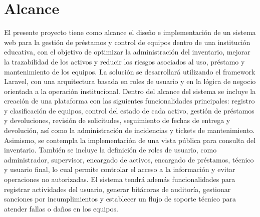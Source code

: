 \section{Alcance}
El presente proyecto tiene como alcance el diseño e implementación de un sistema web para la gestión de préstamos y control de equipos dentro de una institución educativa, con el objetivo de optimizar la administración del inventario, mejorar la trazabilidad de los activos y reducir los riesgos asociados al uso, préstamo y mantenimiento de los equipos. La solución se desarrollará utilizando el framework Laravel, con una arquitectura basada en roles de usuario y en la lógica de negocio orientada a la operación institucional.
Dentro del alcance del sistema se incluye la creación de una plataforma con las siguientes funcionalidades principales: registro y clasificación de equipos, control del estado de cada activo, gestión de préstamos y devoluciones, revisión de solicitudes, seguimiento de fechas de entrega y devolución, así como la administración de incidencias y tickets de mantenimiento. Asimismo, se contempla la implementación de una vista pública para consulta del inventario.
También se incluye la definición de roles de usuario, como administrador, supervisor, encargado de activos, encargado de préstamos, técnico y usuario final, lo cual permite controlar el acceso a la información y evitar operaciones no autorizadas. El sistema tendrá además funcionalidades para registrar actividades del usuario, generar bitácoras de auditoría, gestionar sanciones por incumplimientos y establecer un flujo de soporte técnico para atender fallas o daños en los equipos.


